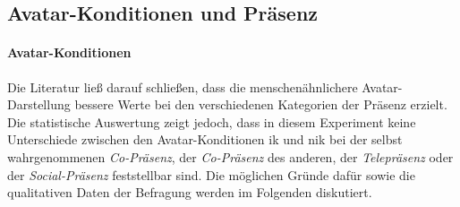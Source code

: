 \documentclass[a4paper,11pt]{article}%
\renewcommand{\\}{\vspace*{0.5\baselineskip} \newline}
\begin{document}
{{%
%
%
%
%
%
%

\subsection{Avatar-Konditionen und Präsenz}
\paragraph{Avatar-Konditionen}
Die Literatur ließ darauf schließen, dass die menschenähnlichere Avatar-Darstellung bessere Werte bei den verschiedenen Kategorien der Präsenz erzielt. Die statistische Auswertung zeigt jedoch, dass in diesem Experiment keine Unterschiede zwischen den Avatar-Konditionen \ac{ik} und \ac{nik} bei der selbst wahrgenommenen \textit{Co-Präsenz}, der \textit{Co-Präsenz} des anderen, der \textit{Telepräsenz} oder der \textit{Social-Präsenz} feststellbar sind. Die möglichen Gründe dafür sowie die qualitativen Daten der Befragung werden im Folgenden diskutiert.

}}
\end{document}
